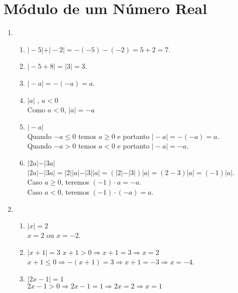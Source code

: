 \documentclass[10pt]{book}
\begin{document}
\section{Módulo de um Número Real}
\begin{enumerate}
	\setcounter{enumi}{0}
	\item %
	\begin{enumerate}
		\item %
		$\vert-5\vert + \vert-2\vert = -(-5) - (-2) = 5 + 2 = 7$.
		\item %
		$\vert-5 + 8\vert = \vert 3 \vert = 3$.
		\item %
		$\vert-a\vert = -(-a) = a$.
		\item %
		$\vert a \vert$ , $a < 0$\\
		Como $a < 0$, $\vert a \vert = -a $
		\item %
		$\vert -a \vert$\\
		Quando $-a \leq 0$ temos $a \geq 0$  e portanto $\vert -a \vert = -(-a)= a$.\\
		Quando $-a > 0$ temos $a < 0$ e portanto $\vert -a \vert = -a$.
		\item %
		$\vert 2a \vert - \vert 3a \vert$\\
		$\vert 2a \vert - \vert 3a \vert = \vert 2\vert \vert a \vert - \vert 3 \vert \vert a \vert = \left( \vert 2\vert  - \vert 3 \vert \right)\vert a \vert = \left( 2  -  3 \right)\vert a \vert = \left(-1 \right)\vert a \vert$.\\
		Caso $a \geq 0$, teremos $\left(-1\right)\cdot a = -a$.\\
		Caso $a < 0$, teremos $(-1)\cdot \left(-a\right) = a$.
	\end{enumerate}
	\item %
	\begin{enumerate}
		\item %
		$\vert x \vert = 2$\\
		$x = 2$ ou $x = - 2$.
		\item %
		$\vert x + 1 \vert = 3$
		$x + 1 > 0 \Rightarrow x + 1 = 3 \Rightarrow x = 2$\\
		$x + 1 \leq 0 \Rightarrow -(x + 1) = 3 \Rightarrow x + 1 = -3 \Rightarrow x = -4$.
		\item %
		$\vert 2x - 1 \vert = 1$\\
		$2x - 1 > 0 \Rightarrow 2x - 1 = 1 \Rightarrow 2x = 2 \Rightarrow x = 1$\\

\end{enumerate}
\end{enumerate}
\end{document}
